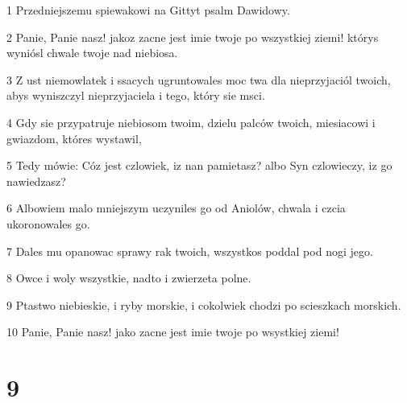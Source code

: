 \par 1 Przedniejszemu spiewakowi na Gittyt psalm Dawidowy.
\par 2 Panie, Panie nasz! jakoz zacne jest imie twoje po wszystkiej ziemi! którys wyniósl chwale twoje nad niebiosa.
\par 3 Z ust niemowlatek i ssacych ugruntowales moc twa dla nieprzyjaciól twoich, abys wyniszczyl nieprzyjaciela i tego, który sie msci.
\par 4 Gdy sie przypatruje niebiosom twoim, dzielu palców twoich, miesiacowi i gwiazdom, któres wystawil,
\par 5 Tedy mówie: Cóz jest czlowiek, iz nan pamietasz? albo Syn czlowieczy, iz go nawiedzasz?
\par 6 Albowiem malo mniejszym uczyniles go od Aniolów, chwala i czcia ukoronowales go.
\par 7 Dales mu opanowac sprawy rak twoich, wszystkos poddal pod nogi jego.
\par 8 Owce i woly wszystkie, nadto i zwierzeta polne.
\par 9 Ptastwo niebieskie, i ryby morskie, i cokolwiek chodzi po scieszkach morskich.
\par 10 Panie, Panie nasz! jako zacne jest imie twoje po wsystkiej ziemi!

\chapter{9}

